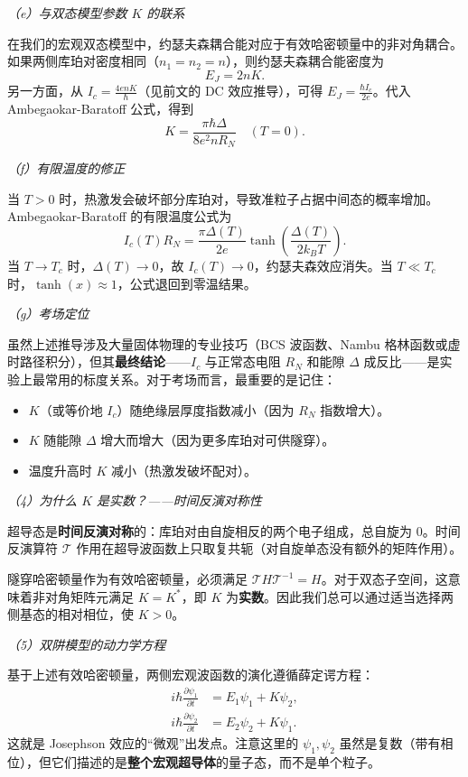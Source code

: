\textit{（e）与双态模型参数 $K$ 的联系}

在我们的宏观双态模型中，约瑟夫森耦合能对应于有效哈密顿量中的非对角耦合。如果两侧库珀对密度相同（$n_1=n_2=n$），则约瑟夫森耦合能密度为
\[
E_J = 2nK.
\]
另一方面，从 $I_c = \frac{4enK}{\hbar}$（见前文的 DC 效应推导），可得 $E_J = \frac{\hbar I_c}{2e}$。代入 Ambegaokar-Baratoff 公式，得到
\[
\boxed{K = \frac{\pi\hbar\Delta}{8e^2 n R_N}} \quad (T=0).
\]

\textit{（f）有限温度的修正}

当 $T>0$ 时，热激发会破坏部分库珀对，导致准粒子占据中间态的概率增加。Ambegaokar-Baratoff 的有限温度公式为
\[
I_c(T) R_N = \frac{\pi\Delta(T)}{2e} \tanh\left( \frac{\Delta(T)}{2k_B T} \right).
\]
当 $T \to T_c$ 时，$\Delta(T) \to 0$，故 $I_c(T) \to 0$，约瑟夫森效应消失。当 $T \ll T_c$ 时，$\tanh(x) \approx 1$，公式退回到零温结果。

\textit{（g）考场定位}

虽然上述推导涉及大量固体物理的专业技巧（BCS 波函数、Nambu 格林函数或虚时路径积分），但其\textbf{最终结论}——$I_c$ 与正常态电阻 $R_N$ 和能隙 $\Delta$ 成反比——是实验上最常用的标度关系。对于考场而言，最重要的是记住：
\begin{itemize}[nosep]
    \item $K$（或等价地 $I_c$）随绝缘层厚度指数减小（因为 $R_N$ 指数增大）。
    \item $K$ 随能隙 $\Delta$ 增大而增大（因为更多库珀对可供隧穿）。
    \item 温度升高时 $K$ 减小（热激发破坏配对）。
\end{itemize}

\textit{（4）为什么 $K$ 是实数？——时间反演对称性}

超导态是\textbf{时间反演对称}的：库珀对由自旋相反的两个电子组成，总自旋为 0。时间反演算符 $\mathcal{T}$ 作用在超导波函数上只取复共轭（对自旋单态没有额外的矩阵作用）。

隧穿哈密顿量作为有效哈密顿量，必须满足 $\mathcal{T} H \mathcal{T}^{-1} = H$。对于双态子空间，这意味着非对角矩阵元满足 $K = K^*$，即 $K$ 为\textbf{实数}。因此我们总可以通过适当选择两侧基态的相对相位，使 $K>0$。

\textit{（5）双阱模型的动力学方程}

基于上述有效哈密顿量，两侧宏观波函数的演化遵循薛定谔方程：
\begin{align*}
i\hbar\frac{\partial\psi_1}{\partial t} &= E_1\psi_1 + K\psi_2, \\
i\hbar\frac{\partial\psi_2}{\partial t} &= E_2\psi_2 + K\psi_1.
\end{align*}
这就是 Josephson 效应的``微观''出发点。注意这里的 $\psi_1, \psi_2$ 虽然是复数（带有相位），但它们描述的是\textbf{整个宏观超导体}的量子态，而不是单个粒子。

